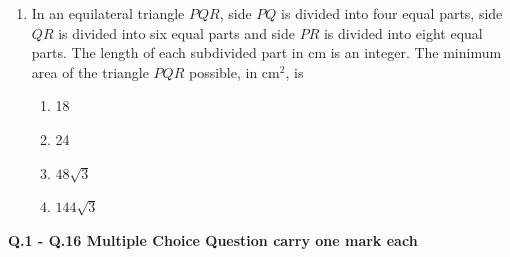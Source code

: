 \documentclass[journal,12pt,onecolumn]{article}
\theoremstyle{remark}
\begin{document}
\begin{enumerate}
\item In an equilateral triangle $PQR$, side $PQ$ is divided into four equal parts, side $QR$ is divided into six equal parts and side $PR$ is divided into eight equal parts. The length of each subdivided part in cm is an integer.
The minimum area of the triangle $PQR$ possible, in cm$^2$, is

\hfill{}

\begin{multicols}{2}
\begin{enumerate}
    \item 18
    \item 24
    \item $48\sqrt{3}$
    \item $144\sqrt{3}$
\end{enumerate}
\end{multicols}
\end{enumerate}

\textbf{Q.1 - Q.16 Multiple Choice Question carry one mark each }
\end{document}
